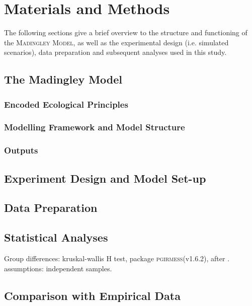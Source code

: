 \chapter{Materials and Methods}
\label{chap:mat}
The following sections give a brief overview to the    structure and functioning of the \textsc{Madingley Model}, as well as the experimental design (i.e. simulated scenarios), data preparation and subsequent analyses used in this study.
\section{The Madingley Model}
\label{chap:mat:madingley}

\subsection{Encoded Ecological Principles}
\label{chap:mat:madingley:princip}

\subsection{Modelling Framework and Model Structure}
\label{chap:mat:madingley:structure}

\subsection{Outputs}
\label{chap:mat:madingley:output}

\section{Experiment Design and Model Set-up}
\label{chap:mat:exp}

\section{Data Preparation}
\label{chap:mat:data}

\section{Statistical Analyses}
\label{chap:mat:stats}

Group differences: kruskal-wallis H test, package \textsc{pgirmess}(v1.6.2), after \cite{Siegel1988}. assumptions: independent samples.

\section{Comparison with Empirical Data}
\label{chap:mat:emp}

